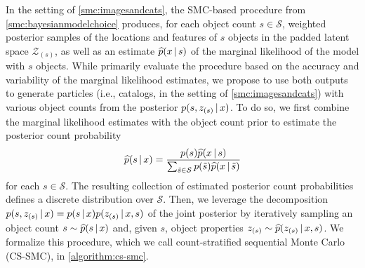 \documentclass[
  12pt]{article}
\newcommand{\padvert}{\thinspace \vert \thinspace}
\begin{document}
In the setting of \autoref{smc:imagesandcats}, the SMC-based procedure from \autoref{smc:bayesianmodelchoice} produces, for each object count $s \in \mathcal{S}$, weighted posterior samples of the locations and features of $s$ objects in the padded latent space $\mathcal{Z}_{(s)}$, as well as an estimate $\widehat{p}(x \padvert s)$ of the marginal likelihood of the model with $s$ objects. While \cite{zhou2016toward} primarily evaluate the procedure based on the accuracy and variability of the marginal likelihood estimates, we propose to use both outputs to generate particles (i.e., catalogs, in the setting of \autoref{smc:imagesandcats}) with various object counts from the posterior $p(s, z_{(s)} \padvert x)$. To do so, we first combine the marginal likelihood estimates with the object count prior to estimate the posterior count probability
\begin{equation*}
    \widehat{p}(s \padvert x) = \frac{p(s) \widehat{p}(x \padvert s)}{\sum_{\tilde{s} \in \mathcal{S}} p(\tilde{s}) \widehat{p}(x \padvert \tilde{s})}
\end{equation*}
for each $s \in \mathcal{S}$. The resulting collection of estimated posterior count probabilities defines a discrete distribution over $\mathcal{S}$. Then, we leverage the decomposition $p(s, z_{(s)} \padvert x) = p(s \padvert x) p(z_{(s)} \padvert x, s)$ of the joint posterior by iteratively sampling an object count $s \sim \widehat{p}(s \padvert x)$ and, given $s$, object properties $z_{(s)} \sim \widehat{p}(z_{(s)} \padvert x, s)$. We formalize this procedure, which we call count-stratified sequential Monte Carlo (CS-SMC), in \autoref{algorithm:cs-smc}.
\end{document}
